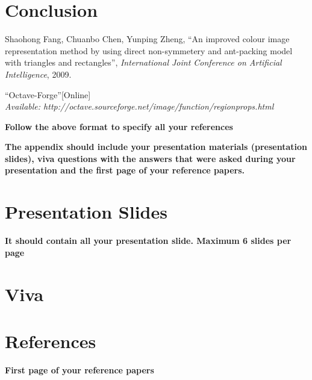 \documentclass[12pt]{report}
\begin{document}




\chapter{Conclusion}

\begin{thebibliography}{100} 

 Shaohong Fang, Chuanbo Chen, Yunping Zheng, \textquotedblleft An improved colour image representation method by using direct non-symmetery and ant-packing model with triangles and rectangles\textquotedblright, \textit{International Joint Conference on Artificial Intelligence}, 2009.


 \textquotedblleft Octave-Forge\textquotedblright[Online]\\ 
\textit{Available: http://octave.sourceforge.net/image/function/regionprops.html}


\vspace{2cm}

\textbf{Follow the above format to specify all your references}

\end{thebibliography}

\begin{appendices}
\textbf{The appendix should include your presentation materials (presentation slides), viva questions with the answers that were asked during your presentation and the first page of your reference papers.}
\chapter*{Presentation Slides}
\textbf{It should contain all your presentation slide. Maximum 6 slides per page}
\chapter*{Viva }
\chapter*{References}
\textbf{First page of your reference papers}

\end{appendices}
\end{document}
